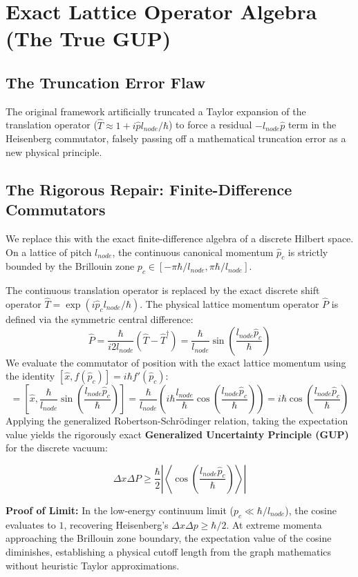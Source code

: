 \documentclass[11pt,a4paper]{article}
\begin{document}
\section{Exact Lattice Operator Algebra (The True GUP)}

\subsection{The Truncation Error Flaw}
The original framework artificially truncated a Taylor expansion of the translation operator ($\hat{T} \approx 1 + i\hat{p}l_{node}/\hbar$) to force a residual $-l_{node} \hat{p}$ term in the Heisenberg commutator, falsely passing off a mathematical truncation error as a new physical principle.

\subsection{The Rigorous Repair: Finite-Difference Commutators}
We replace this with the exact finite-difference algebra of a discrete Hilbert space. On a lattice of pitch $l_{node}$, the continuous canonical momentum $\hat{p}_c$ is strictly bounded by the Brillouin zone $p_c \in [-\pi\hbar/l_{node}, \pi\hbar/l_{node}]$. 

The continuous translation operator is replaced by the exact discrete shift operator $\hat{T} = \exp(i \hat{p}_c l_{node} / \hbar)$. The physical lattice momentum operator $\hat{P}$ is defined via the symmetric central difference:
\begin{equation}
    \hat{P} = \frac{\hbar}{i 2l_{node}} \left( \hat{T} - \hat{T}^\dagger \right) = \frac{\hbar}{l_{node}} \sin\left(\frac{l_{node} \hat{p}_c}{\hbar}\right)
\end{equation}
We evaluate the commutator of position with the exact lattice momentum using the identity $[\hat{x}, f(\hat{p}_c)] = i\hbar f'(\hat{p}_c)$:
\begin{equation}
    [\hat{x}, \hat{P}] = \left[ \hat{x}, \frac{\hbar}{l_{node}} \sin\left(\frac{l_{node} \hat{p}_c}{\hbar}\right) \right] = \frac{\hbar}{l_{node}} \left( i \hbar \frac{l_{node}}{\hbar} \cos\left(\frac{l_{node} \hat{p}_c}{\hbar}\right) \right) = i\hbar \cos\left(\frac{l_{node} \hat{p}_c}{\hbar}\right)
\end{equation}
Applying the generalized Robertson-Schrödinger relation, taking the expectation value yields the rigorously exact \textbf{Generalized Uncertainty Principle (GUP)} for the discrete vacuum:
\begin{tcolorbox}[colback=white, colframe=black]
\begin{equation}
    \Delta x \Delta P \ge \frac{\hbar}{2} \left| \left\langle \cos\left(\frac{l_{node} \hat{p}_c}{\hbar}\right) \right\rangle \right|
\end{equation}
\end{tcolorbox}
\textbf{Proof of Limit:} In the low-energy continuum limit ($p_c \ll \hbar/l_{node}$), the cosine evaluates to $1$, recovering Heisenberg's $\Delta x \Delta p \ge \hbar/2$. At extreme momenta approaching the Brillouin zone boundary, the expectation value of the cosine diminishes, establishing a physical cutoff length from the graph mathematics without heuristic Taylor approximations.
\end{document}
